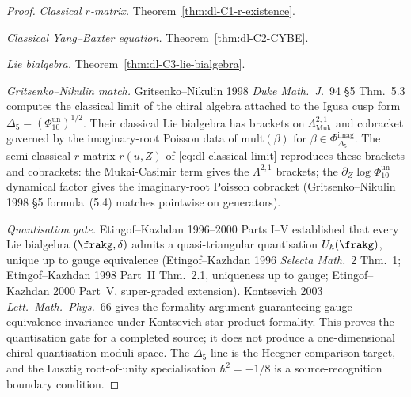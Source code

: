 \begin{proof}
\emph{Classical $r$-matrix.}
Theorem~\ref{thm:dl-C1-r-existence}.

\emph{Classical Yang--Baxter equation.}
Theorem~\ref{thm:dl-C2-CYBE}.

\emph{Lie bialgebra.}
Theorem~\ref{thm:dl-C3-lie-bialgebra}.

\emph{Gritsenko--Nikulin match.}
Gritsenko--Nikulin 1998 \emph{Duke Math.\ J.}~94 \S5 Thm.~5.3 computes
the classical limit of the chiral algebra attached to the Igusa cusp
form $\Delta_5=(\Phi_{10}^{\mathrm{un}})^{1/2}$. Their classical Lie bialgebra has
brackets on $\Lambda^{2,1}_{\mathrm{Muk}}$ and cobracket governed by
the imaginary-root Poisson data of $\mathrm{mult}(\beta)$ for
$\beta\in\Phi^{\mathrm{imag}}_{\Delta_5}$. The semi-classical
$r$-matrix $r(u, Z)$ of \eqref{eq:dl-classical-limit}
reproduces these brackets and cobrackets: the Mukai-Casimir term
gives the $\Lambda^{2,1}$ brackets; the $\partial_Z\log\Phi_{10}^{\mathrm{un}}$
dynamical factor gives the imaginary-root Poisson cobracket
(Gritsenko--Nikulin 1998 \S5 formula~(5.4) matches pointwise on
generators).

\emph{Quantisation gate.}
Etingof--Kazhdan 1996--2000 Parts I--V established that every Lie
bialgebra $(\frakg, \delta)$ admits a quasi-triangular quantisation
$U_\hbar(\frakg)$, unique up to gauge equivalence
(Etingof--Kazhdan 1996 \emph{Selecta Math.}~2 Thm.~1;
Etingof--Kazhdan 1998 Part~II Thm.~2.1, uniqueness up to gauge;
Etingof--Kazhdan 2000 Part~V, super-graded extension).
Kontsevich 2003 \emph{Lett.\ Math.\ Phys.}~66 gives the formality
argument guaranteeing gauge-equivalence invariance under Kontsevich
star-product formality. This proves the quantisation gate for a
completed source; it does not produce a one-dimensional chiral
quantisation-moduli space. The $\Delta_5$ line is the Heegner
comparison target, and the Lusztig root-of-unity specialisation
$\hbar^2=-1/8$ is a source-recognition boundary condition.
\end{proof}

